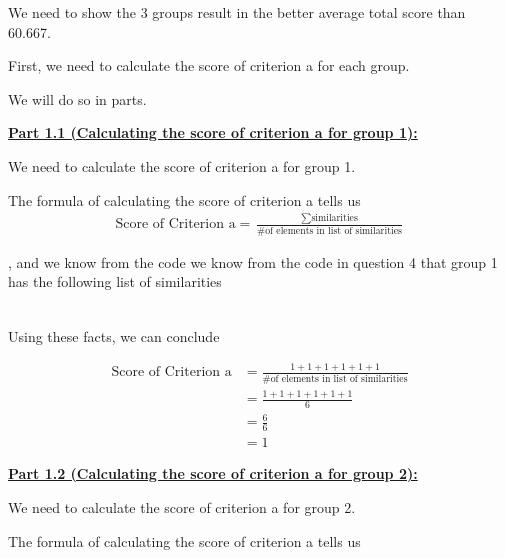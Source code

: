 \documentclass[12pt]{article}
\begin{document}
\begin{itemize}
    \bigskip

    We need to show the 3 groups result in the better average total score
    than 60.667.

    \bigskip

    First, we need to calculate the score of criterion a for each group.

    \bigskip

    We will do so in parts.

    \bigskip

    \underline{\textbf{Part 1.1 (Calculating the score of criterion a for group 1):}}

    \bigskip

    We need to calculate the score of criterion a for group 1.

    \bigskip

    The formula of calculating the score of criterion a tells us
    \setcounter{equation}{0}
    \begin{align}
        \text{Score of Criterion a} = \frac{\sum \text{similarities}}{\text{\# of elements in list of similarities}}
    \end{align}

    , and we know from the code we know from the code in question 4 that group 1 has the following
    list of similarities

    \begin{align}
        [1,1,1,1,1,1]
    \end{align}

    \bigskip

    Using these facts, we can conclude

    \begin{align}
        \text{Score of Criterion a} &= \frac{1 + 1 + 1 + 1 + 1 + 1}{\text{\# of elements in list of similarities}}\\
        &= \frac{1 + 1 + 1 + 1 + 1 + 1}{6}\\
        &= \frac{6}{6}\\
        &= 1
    \end{align}

    \bigskip

    \underline{\textbf{Part 1.2 (Calculating the score of criterion a for group 2):}}

    \bigskip

    We need to calculate the score of criterion a for group 2.

    \bigskip

    The formula of calculating the score of criterion a tells us


\end{itemize}
\end{document}
